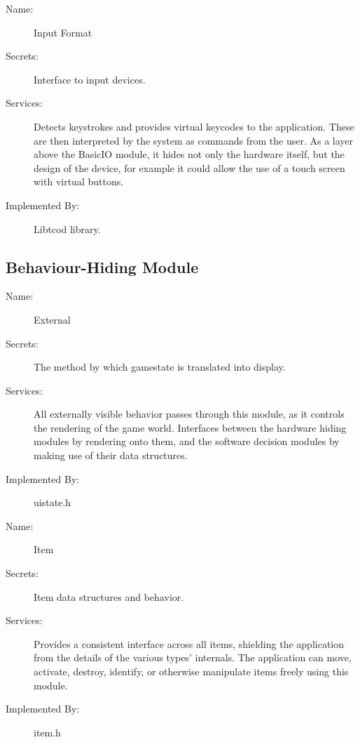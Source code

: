 \documentclass[12pt, titlepage]{article}
\begin{document}
        \bigskip\begin{description}
            \item[Name:]Input Format
            \item[Secrets:]Interface to input devices.
            \item[Services:]Detects keystrokes and provides virtual keycodes to the application. These are then interpreted by the system as commands from the user. As a layer above the BasicIO module, it hides not only the hardware itself, but the design of the device, for example it could allow the use of a touch screen with virtual buttons.
            \item[Implemented By:]Libtcod library.
        \end{description}

    \subsection{Behaviour-Hiding Module}

        \bigskip\begin{description}
            \item[Name:]External
            \item[Secrets:]The method by which gamestate is translated into display.
            \item[Services:]All externally visible behavior passes through this module, as it controls the rendering of the game world. Interfaces between the hardware hiding modules by rendering onto them, and the software decision modules by making use of their data structures.
            \item[Implemented By:]uistate.h
        \end{description}

        \bigskip\begin{description}
            \item[Name:]Item
            \item[Secrets:]Item data structures and behavior.
            \item[Services:]Provides a consistent interface across all items, shielding the application from the details of the various types' internals. The application can move, activate, destroy, identify, or otherwise manipulate items freely using this module.
            \item[Implemented By:]item.h
        \end{description}
\end{document}
